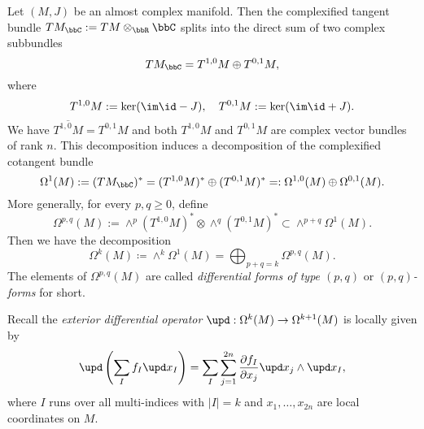     Let \((M,J)\) be an almost complex manifold.
    Then the complexified tangent bundle \(TM_\bbC  := TM \otimes_\bbR \bbC\) splits into the direct sum of two complex subbundles
    \[ T M_\bbC = T^{1,0}M \oplus T^{0,1}M, \]
    where 
    \[ T^{1,0}M := \ker (\im \id - J), \quad T^{0,1}M := \ker (\im \id + J). \]
    We have \(\overline{T^{1,0}M} = T^{0,1}M\) and both \(T^{1,0}M\) and \(T^{0,1}M\) are complex vector bundles of rank \(n\).
    This decomposition induces a decomposition of the complexified cotangent bundle
    \[ \Omega^1(M) := (TM_\bbC)^* = (T^{1,0}M)^* \oplus (T^{0,1}M)^* =: \Omega^{1,0}(M) \oplus \Omega^{0,1}(M). \]
    More generally, for every \(p,q \geq 0\), define
    \[ \Omega^{p,q}(M) := \wedge^p (T^{1,0}M)^* \otimes \wedge^q (T^{0,1}M)^* \subset \wedge^{p+q} \Omega^1(M). \]
    Then we have the decomposition
    \[ \Omega^k(M) \coloneqq \wedge^k \Omega^1(M) = \bigoplus_{p+q=k} \Omega^{p,q}(M). \]
    The elements of \(\Omega^{p,q}(M)\) are called \emph{differential forms of type \((p,q)\)} or \emph{\((p,q)\)-forms} for short.

    Recall the \emph{exterior differential operator} \(\upd:\Omega^k(M) \to \Omega^{k+1}(M)\) is locally given by 
    \[ \upd\left(\sum_I f_I \upd x_I\right) = \sum_I \sum_{j=1}^{2n} \frac{\partial f_I}{\partial x_j} \upd x_j \wedge \upd x_I, \]
    where \(I\) runs over all multi-indices with \(|I| = k\) and \(x_1, \ldots, x_{2n}\) are local coordinates on \(M\).

